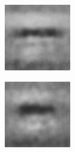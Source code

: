 \begin{figure}[H]
\begin{subfigure}[t]{0.13\textwidth}
  \end{subfigure}
  \begin{subfigure}[t]{0.13\textwidth}
    \centering
    \includegraphics[width=\linewidth]{img/one-trial/prediction_1_msssim.png}
  \end{subfigure}
  \begin{subfigure}[t]{0.13\textwidth}
    \centering
    \includegraphics[width=\linewidth]{img/one-trial/prediction_1_mix.png}

\end{subfigure}
\end{figure}
